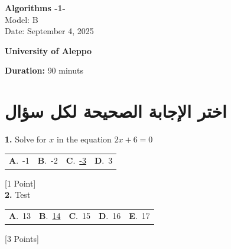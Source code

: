\documentclass[12pt]{article}
\newcommand{\choice}[2]{\textbf{#1}.~#2}
\begin{document}
\begin{flushright}
{\Large \textbf{{\textenglish{Algorithms -1-}}}}\\[0.25em]
{\normalsize \textenglish{Model: }{\textenglish{B}}}\\[0.1em]
{\normalsize \textenglish{Date: }{\textenglish{September 4, 2025}}}
\end{flushright}

\vspace{0.6cm}

\noindent
\begin{minipage}[t]{0.65\textwidth}
  \raggedright
  \textbf{{\textenglish{University of Aleppo}}}\\[0.3em]
\end{minipage}\hfill
\begin{minipage}[t]{0.3\textwidth}
  \raggedleft
  \textenglish{\textbf{Duration: }}{\textenglish{90 minuts}}
\end{minipage}

\vspace{0.9cm}

\section*{اختر الإجابة الصحيحة لكل سؤال}

\noindent \textbf{\textenglish{1.}} {\textenglish{Solve for }}\(x \){\textenglish{ in the equation }}\(2x+6 = 0 \)

\begin{tabularx}{\linewidth}{@{}*{4}{Y}@{}}
\choice{A}{{{\textenglish{-1}}}} & \choice{B}{{{\textenglish{-2}}}} & \choice{C}{{\underline{{\textenglish{-3}}}}} & \choice{D}{{{\textenglish{3}}}} \\
\end{tabularx}
\hfill {\textenglish{[1 Point]}}\\[0.5em]

\noindent \textbf{\textenglish{2.}} {\textenglish{Test}}

\begin{tabularx}{\linewidth}{@{}*{5}{Y}@{}}
\choice{A}{{{\textenglish{13}}}} & \choice{B}{{\underline{{\textenglish{14}}}}} & \choice{C}{{{\textenglish{15}}}} & \choice{D}{{{\textenglish{16}}}} & \choice{E}{{{\textenglish{17}}}} \\
\end{tabularx}
\hfill {\textenglish{[3 Points]}}\\[0.5em]
\end{document}
